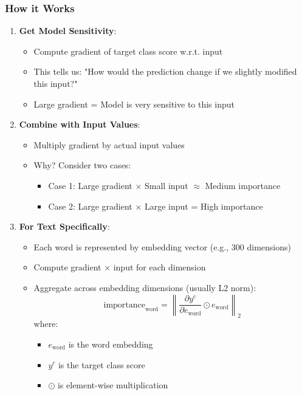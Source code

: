 \documentclass{article}
\begin{document}
\subsubsection{How it Works}
\begin{enumerate}
    \item \textbf{Get Model Sensitivity}:
        \begin{itemize}
            \item Compute gradient of target class score w.r.t. input
            \item This tells us: "How would the prediction change if we slightly modified this input?"
            \item Large gradient = Model is very sensitive to this input
        \end{itemize}
    
    \item \textbf{Combine with Input Values}:
        \begin{itemize}
            \item Multiply gradient by actual input values
            \item Why? Consider two cases:
                \begin{itemize}
                    \item Case 1: Large gradient × Small input $\approx$ Medium importance
                    \item Case 2: Large gradient × Large input = High importance
                \end{itemize}
        \end{itemize}
    
    \item \textbf{For Text Specifically}:
        \begin{itemize}
            \item Each word is represented by embedding vector (e.g., 300 dimensions)
            \item Compute gradient × input for each dimension
            \item Aggregate across embedding dimensions (usually L2 norm):
                \begin{equation}
                    \text{importance}_{\text{word}} = \left\|\frac{\partial y^c}{\partial e_{\text{word}}} \odot e_{\text{word}}\right\|_2
                \end{equation}
            where:
                \begin{itemize}
                    \item $e_{\text{word}}$ is the word embedding
                    \item $y^c$ is the target class score
                    \item $\odot$ is element-wise multiplication
                \end{itemize}
        \end{itemize}
\end{enumerate}
\end{document}
